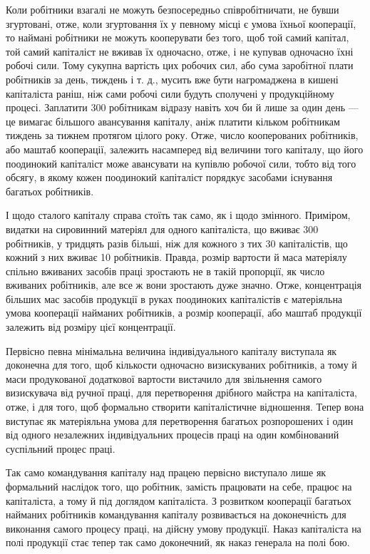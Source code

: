 \parcont{}  %
Коли робітники взагалі не можуть безпосередньо співробітничати,
не бувши згуртовані, отже, коли згуртовання їх у певному
місці є умова їхньої кооперації, то наймані робітники не можуть
кооперувати без того, щоб той самий капітал, той самий капіталіст
не вживав їх одночасно, отже, і не купував одночасно їхні робочі
сили. Тому сукупна вартість цих робочих сил, або сума заробітної
плати робітників за день, тиждень і т. д., мусить вже бути нагромаджена
в кишені капіталіста раніш, ніж сами робочі сили будуть
сполучені у продукційному процесі. Заплатити 300 робітникам
відразу навіть хоч би й лише за один день — це вимагає
більшого авансування капіталу, аніж платити кільком робітникам
тиждень за тижнем протягом цілого року. Отже, число
кооперованих робітників, або маштаб кооперації, залежить насамперед
від величини того капіталу, що його поодинокий капіталіст
може авансувати на купівлю робочої сили, тобто від того обсягу,
в якому кожен поодинокий капіталіст порядкує засобами
існування багатьох робітників.

І щодо сталого капіталу справа стоїть так само, як і щодо
змінного. Приміром, видатки на сировинний матеріял для одного
капіталіста, що вживає 300 робітників, у тридцять разів більші,
ніж для кожного з тих 30 капіталістів, що кожний з них вживає
10 робітників. Правда, розмір вартости й маса матеріялу спільно
вживаних засобів праці зростають не в такій пропорції, як число
вживаних робітників, але все ж вони зростають дуже значно.
Отже, концентрація більших мас засобів продукції в руках поодиноких
капіталістів є матеріяльна умова кооперації найманих
робітників, а розмір кооперації, або маштаб продукції залежить
від розміру цієї концентрації.

Первісно певна мінімальна величина індивідуального капіталу
виступала як доконечна для того, щоб кількости одночасно
визискуваних робітників, а тому й маси продукованої додаткової
вартости вистачило для звільнення самого визискувача від ручної
праці, для перетворення дрібного майстра на капіталіста, отже,
і для того, щоб формально створити капіталістичне відношення.
Тепер вона виступає як матеріяльна умова для перетворення
багатьох розпорошених і один від одного незалежних індивідуальних
процесів праці на один комбінований суспільний процес
праці.

Так само командування капіталу над працею первісно виступало
лише як формальний наслідок того, що робітник, замість
працювати на себе, працює на капіталіста, а тому й під доглядом
капіталіста. З розвитком кооперації багатьох найманих робітників
командування капіталу розвивається на доконечність для
виконання самого процесу праці, на дійсну умову продукції.
Наказ капіталіста на полі продукції стає тепер так само доконечний,
як наказ генерала на полі бою.

